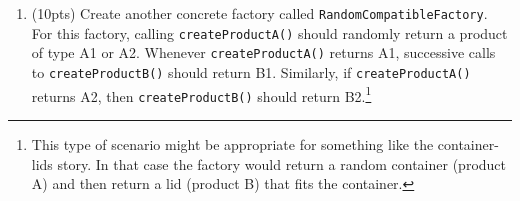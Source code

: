 \documentclass[11pt]{article}
\begin{document}
\begin{enumerate}
\begin{enumerate}
    \item (10pts) Create another concrete factory called \texttt{RandomCompatibleFactory}. For this factory, calling \texttt{createProductA()} should randomly return a product of type A1 or A2. Whenever \texttt{createProductA()} returns A1, successive calls to \texttt{createProductB()} should return B1. Similarly, if \texttt{createProductA()} returns A2, then \texttt{createProductB()} should return B2.\footnote{This type of scenario might be appropriate for something like the container-lids story. In that case the factory would return a random container (product A) and then return a lid (product B) that fits the container.}

  \end{enumerate}

\end{enumerate}
\end{document}
